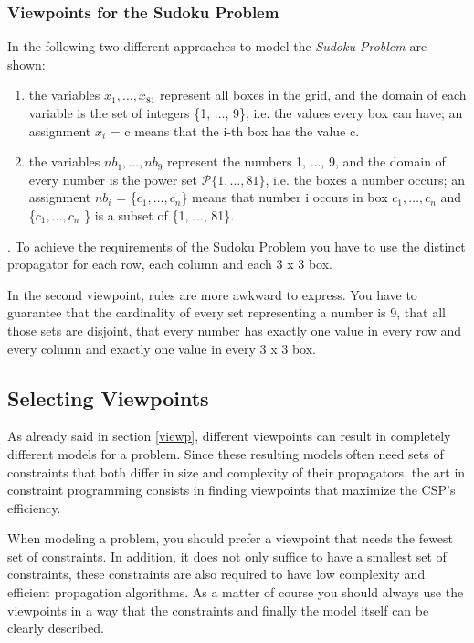 \documentclass[a4paper,halfparskip]{scrartcl}
\begin{document}
\subsubsection{Viewpoints for the Sudoku Problem}
In the following two different approaches to model
the \emph{Sudoku Problem} are shown:
\begin{enumerate}
\item
the variables $x_1, \ldots, x_{81}$ represent all boxes
in the grid, and the domain of each variable is the set
of integers \{1, $\ldots$, 9\}, i.e. the values every box
can have; an assignment $x_i$ = c means that the i-th box
has the value c.
\item
the variables $\mathit{nb}_1, \ldots, \mathit{nb}_9$ represent the numbers
1, $\ldots$, 9, and the domain of every number is the power set
$\mathcal{P}\{1, \dots, 81\}$, i.e. the boxes a number occurs; an
assignment $\mathit{nb}_i$ = \{$c_1, \ldots, c_n $\} means that number i occurs
in box $c_1, \ldots, c_n$ and \{$c_1, \ldots, c_n $ \} is a subset of 
\{1, $\ldots$, 81\}.
\end{enumerate}
. 
To achieve the requirements of the Sudoku Problem you have to
use the distinct propagator for each row, each column and each
3 x 3 box.

In the second viewpoint, rules are more awkward to express.
You have to guarantee that the cardinality of every set representing
a number is 9, that all those sets are disjoint, that every number
has exactly one value in every row and every column and exactly one
value in every 3 x 3 box.

\subsection{Selecting Viewpoints}
As already said in section \ref{viewp}, different viewpoints can
result in completely different models for a problem. Since these
resulting models often need sets of constraints that both differ 
in size and complexity of their propagators, the art in constraint 
programming consists in finding viewpoints that maximize the CSP's
efficiency.

When modeling a problem, you should prefer a viewpoint that needs
the fewest set of constraints. In addition, it does not only suffice
to have a smallest set of constraints, these constraints are also
required to have low complexity and efficient propagation algorithms. 
As a matter of course you should always use the viewpoints in a way that
the constraints and finally the model itself can be clearly described.
\end{document}
